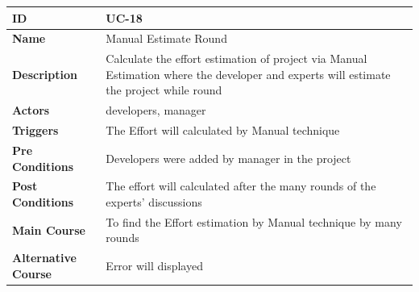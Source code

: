 \begin{center}
    \begin{tabularx}{\textwidth}{|l|X|}
        \hline
        \textbf{ID}                 & UC-18                                                                                                                                  \\
        \hline
        \textbf{Name}               & Manual Estimate Round                                                                                                                  \\
        \hline
        \textbf{Description}        & Calculate the effort estimation of project via Manual Estimation where the developer and experts will estimate the project while round \\
        \hline
        \textbf{Actors}             & developers, manager                                                                                                                    \\
        \hline
        \textbf{Triggers}           & The Effort will calculated by Manual technique                                                                                         \\
        \hline
        \textbf{Pre Conditions}     & Developers were added by manager  in the project                                                                                       \\
        \hline
        \textbf{Post Conditions}    & The effort will calculated after the many rounds of the experts' discussions                                                           \\
        \hline
        \textbf{Main Course}        & To find the Effort estimation by Manual technique by many rounds                                                                       \\
        \hline
        \textbf{Alternative Course} & Error will displayed                                                                                                                   \\
        \hline
    \end{tabularx}
\end{center}

\newpage

